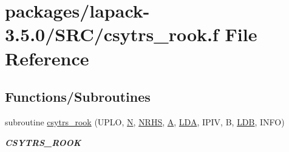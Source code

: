 \hypertarget{csytrs__rook_8f}{}\section{packages/lapack-\/3.5.0/\+S\+R\+C/csytrs\+\_\+rook.f File Reference}
\label{csytrs__rook_8f}
\subsection*{Functions/\+Subroutines}
\begin{DoxyCompactItemize}
\item 
subroutine \hyperlink{group__complexSYcomputational_ga4ede0bcbc69ca218b7b286e767577220}{csytrs\+\_\+rook} (U\+P\+L\+O, \hyperlink{polmisc_8c_a0240ac851181b84ac374872dc5434ee4}{N}, \hyperlink{example__user_8c_aa0138da002ce2a90360df2f521eb3198}{N\+R\+H\+S}, \hyperlink{classA}{A}, \hyperlink{example__user_8c_ae946da542ce0db94dced19b2ecefd1aa}{L\+D\+A}, I\+P\+I\+V, B, \hyperlink{example__user_8c_a50e90a7104df172b5a89a06c47fcca04}{L\+D\+B}, I\+N\+F\+O)
\begin{DoxyCompactList}\small\item\em {\bfseries C\+S\+Y\+T\+R\+S\+\_\+\+R\+O\+O\+K} \end{DoxyCompactList}\end{DoxyCompactItemize}
